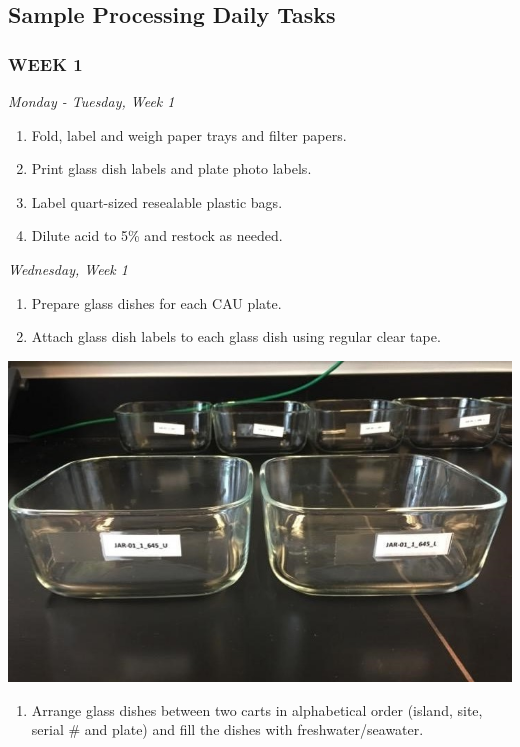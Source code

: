 \documentclass[]{book}
\providecommand{\tightlist}{%
  \setlength{\itemsep}{0pt}\setlength{\parskip}{0pt}}
\begin{document}
\hypertarget{sample-processing-daily-tasks}{%
\subsection{Sample Processing Daily Tasks}\label{sample-processing-daily-tasks}}

\hypertarget{week-1}{%
\subsubsection{WEEK 1}\label{week-1}}

\emph{Monday - Tuesday, Week 1}

\begin{enumerate}
\def\labelenumi{\arabic{enumi}.}
\tightlist
\item
  Fold, label and weigh paper trays and filter papers.
\item
  Print glass dish labels and plate photo labels.
\item
  Label quart-sized resealable plastic bags.
\item
  Dilute acid to 5\% and restock as needed.
\end{enumerate}

\emph{Wednesday, Week 1}

\begin{enumerate}
\def\labelenumi{\arabic{enumi}.}
\tightlist
\item
  Prepare glass dishes for each CAU plate.
\item
  Attach glass dish labels to each glass dish using regular clear tape.
\end{enumerate}

\includegraphics{images/DailyTasks2.jpg}

\begin{enumerate}
\def\labelenumi{\arabic{enumi}.}
\setcounter{enumi}{2}
\tightlist
\item
  Arrange glass dishes between two carts in alphabetical order (island, site, serial \# and plate) and fill the dishes with freshwater/seawater.
\end{enumerate}
\end{document}
